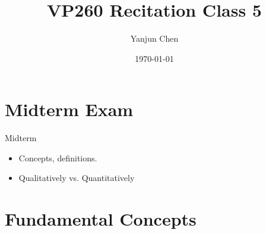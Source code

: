 \documentclass{beamer}
\title[VP260 RC]{VP260 Recitation Class 5} %
\author{Yanjun Chen} %
\institute[UM-SJTU JI] %
{
    University of Michigan - Shanghai Jiao Tong University Joint Institute\\%
\medskip
}
\date{\today} %
\begin{document}
\begin{frame}
    \titlepage %
\end{frame}


\section{Midterm Exam}

\begin{frame}{Midterm}
    \begin{itemize}
        \item Concepts, definitions.
        \item Qualitatively vs. Quantitatively
    \end{itemize}
\end{frame}



\section{Fundamental Concepts} %


\end{document}
